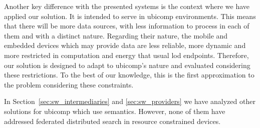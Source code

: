 Another key difference with the presented systems is the context where we have applied our solution.
It is intended to serve in \ac{ubicomp} environments.
This means that there will be more data sources, with less information to process in each of them and with a distinct nature.
Regarding their nature, the mobile and embedded devices which may provide data are less reliable, more dynamic and more restricted in computation and energy that usual \ac{lod} endpoints.
Therefore, our solution is designed to adapt to \ac{ubicomp}'s nature and evaluated considering these restrictions.
To the best of our knowledge, this is the first approximation to the problem considering these constraints.


\bigskip


In Section~\ref{sec:sw_intermediaries} and \ref{sec:sw_providers} we have analyzed other solutions for \ac{ubicomp} which use semantics.
However, none of them have addressed federated distributed search in resource constrained devices.












